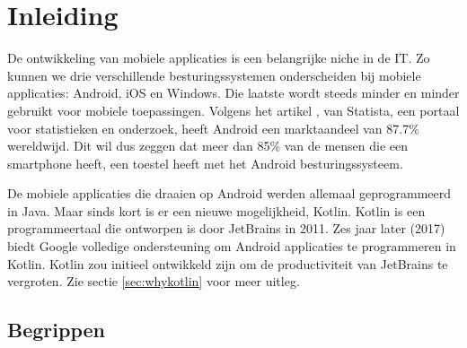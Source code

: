 \chapter{Inleiding}
\label{ch:inleiding}




 De ontwikkeling van mobiele applicaties is een belangrijke niche in de IT. Zo kunnen we drie verschillende besturingssystemen onderscheiden bij mobiele applicaties: Android, iOS en Windows. Die laatste wordt steeds minder en minder gebruikt voor mobiele toepassingen. Volgens het artikel \textcite{Statista2018}, van Statista, een portaal voor statistieken en onderzoek, heeft Android een marktaandeel van 87.7\% wereldwijd. Dit wil dus zeggen dat meer dan 85\% van de mensen die een smartphone heeft, een toestel heeft met het Android besturingssysteem. 

 De mobiele applicaties die draaien op Android werden allemaal geprogrammeerd in Java. Maar sinds kort is er een nieuwe mogelijkheid, Kotlin. Kotlin is een programmeertaal die ontworpen is door JetBrains in 2011. Zes jaar later (2017) biedt Google volledige ondersteuning om Android applicaties te programmeren in Kotlin. Kotlin zou initieel ontwikkeld zijn om de productiviteit van JetBrains te vergroten. Zie sectie \ref{sec:whykotlin} voor meer uitleg.
 
 \section{Begrippen}
